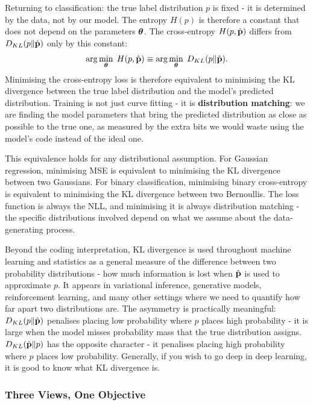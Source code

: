 Returning to classification: the true label distribution $p$ is fixed - it is determined by the data, not by our model. The entropy $H(p)$ is therefore a constant that does not depend on the parameters $\boldsymbol{\theta}$. The cross-entropy $H(p, \hat{\mathbf{p}})$ differs from $D_{KL}(p \| \hat{\mathbf{p}})$ only by this constant:
\begin{equation}
    \arg\min_{\boldsymbol{\theta}}\; H(p, \hat{\mathbf{p}}) \equiv \arg\min_{\boldsymbol{\theta}}\; D_{KL}(p \| \hat{\mathbf{p}}).
\end{equation}
Minimising the cross-entropy loss is therefore equivalent to minimising the KL divergence between the true label distribution and the model's predicted distribution. Training is not just curve fitting - it is \textbf{distribution matching}: we are finding the model parameters that bring the predicted distribution as close as possible to the true one, as measured by the extra bits we would waste using the model's code instead of the ideal one.

This equivalence holds for any distributional assumption. For Gaussian regression, minimising MSE is equivalent to minimising the KL divergence between two Gaussians. For binary classification, minimising binary cross-entropy is equivalent to minimising the KL divergence between two Bernoullis. The loss function is always the NLL, and minimising it is always distribution matching - the specific distributions involved depend on what we assume about the data-generating process.

Beyond the coding interpretation, KL divergence is used throughout machine learning and statistics as a general measure of the difference between two probability distributions - how much information is lost when $\hat{\mathbf{p}}$ is used to approximate $p$. It appears in variational inference, generative models, reinforcement learning, and many other settings where we need to quantify how far apart two distributions are. The asymmetry is practically meaningful: $D_{KL}(p \| \hat{\mathbf{p}})$ penalises placing low probability where $p$ places high probability - it is large when the model misses probability mass that the true distribution assigns. $D_{KL}(\hat{\mathbf{p}} \| p)$ has the opposite character - it penalises placing high probability where $p$ places low probability. Generally, if you wish to go deep in deep learning, it is good to know what KL divergence is.

\subsubsection{Three Views, One Objective}

